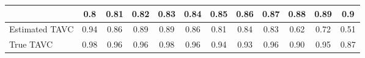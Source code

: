 \begin{tabular}{|l|c|c|c|c|c|c|c|c|c|c|c|}
  \hline
 & 0.8 & 0.81 & 0.82 & 0.83 & 0.84 & 0.85 & 0.86 & 0.87 & 0.88 & 0.89 & 0.9 \\ 
  \hline
Estimated TAVC & 0.94 & 0.86 & 0.89 & 0.89 & 0.86 & 0.81 & 0.84 & 0.83 & 0.62 & 0.72 & 0.51 \\ 
  True TAVC & 0.98 & 0.96 & 0.96 & 0.98 & 0.96 & 0.94 & 0.93 & 0.96 & 0.90 & 0.95 & 0.87 \\ 
   \hline
\end{tabular}
